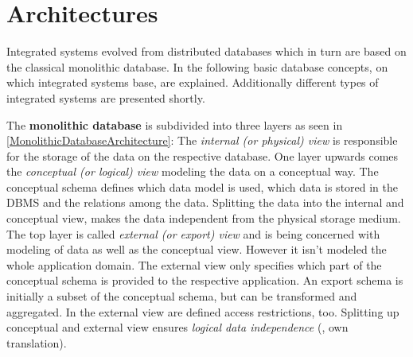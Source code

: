 \section{Architectures}

Integrated systems evolved from distributed databases which in turn are based on the classical monolithic database. In the following basic database concepts, on which integrated systems base, are explained. Additionally different types of integrated systems are presented shortly.

The \textbf{monolithic database} is subdivided into three layers as seen in \ref{MonolithicDatabaseArchitecture}: The \textit{internal (or physical) view} is responsible for the storage of the data on the respective database. One layer upwards comes the \textit{conceptual (or logical) view} modeling the data on a conceptual way. The conceptual schema defines which data model is used, which data is stored in the DBMS and the relations among the data.
Splitting the data into the internal and conceptual view, makes the data independent from the physical storage medium. The top layer is called \textit{external (or export) view} and is being concerned with modeling of data as well as the conceptual view. However it isn't modeled the whole application domain. The external view only specifies which part of the conceptual schema is provided to the respective application. An export schema is initially a subset of the conceptual schema, but can be transformed and aggregated. In the external view are defined access restrictions, too. Splitting up conceptual and external view ensures \textit{logical data independence} (\cite[p. 84/85]{DBLP:books/dp/LeserN2006}, own translation).
